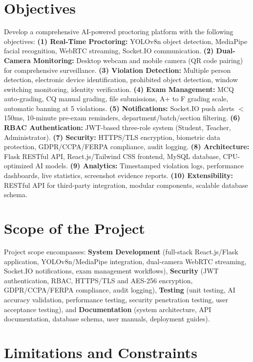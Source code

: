 \section{Objectives}

Develop a comprehensive AI-powered proctoring platform with the following objectives: \textbf{(1) Real-Time Proctoring:} YOLOv8n object detection, MediaPipe facial recognition, WebRTC streaming, Socket.IO communication. \textbf{(2) Dual-Camera Monitoring:} Desktop webcam and mobile camera (QR code pairing) for comprehensive surveillance. \textbf{(3) Violation Detection:} Multiple person detection, electronic device identification, prohibited object detection, window switching monitoring, identity verification. \textbf{(4) Exam Management:} MCQ auto-grading, CQ manual grading, file submissions, A+ to F grading scale, automatic banning at 5 violations. \textbf{(5) Notifications:} Socket.IO push alerts $<$150ms, 10-minute pre-exam reminders, department/batch/section filtering. \textbf{(6) RBAC Authentication:} JWT-based three-role system (Student, Teacher, Administrator). \textbf{(7) Security:} HTTPS/TLS encryption, biometric data protection, GDPR/CCPA/FERPA compliance, audit logging. \textbf{(8) Architecture:} Flask RESTful API, React.js/Tailwind CSS frontend, MySQL database, CPU-optimized AI models. \textbf{(9) Analytics:} Timestamped violation logs, performance dashboards, live statistics, screenshot evidence reports. \textbf{(10) Extensibility:} RESTful API for third-party integration, modular components, scalable database schema.

\section{Scope of the Project}

Project scope encompasses: \textbf{System Development} (full-stack React.js/Flask application, YOLOv8n/MediaPipe integration, dual-camera WebRTC streaming, Socket.IO notifications, exam management workflows), \textbf{Security} (JWT authentication, RBAC, HTTPS/TLS and AES-256 encryption, GDPR/CCPA/FERPA compliance, audit logging), \textbf{Testing} (unit testing, AI accuracy validation, performance testing, security penetration testing, user acceptance testing), and \textbf{Documentation} (system architecture, API documentation, database schema, user manuals, deployment guides).

\section{Limitations and Constraints}

